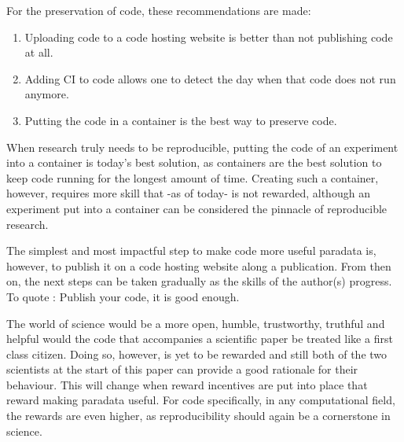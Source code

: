 For the preservation of code, these recommendations are made:

\begin{enumerate}
  \item Uploading code to a code hosting website is better than
    not publishing code at all.
  \item Adding CI to code allows one to detect the day when that code 
    does not run anymore.
  \item Putting the code in a container is the best way to preserve code.
\end{enumerate}


When research truly needs to be reproducible, putting the code 
of an experiment into a container is today's best solution,
as containers are the best solution to keep code running for the longest 
amount of time.
Creating such a container, however, requires more skill
that -as of today- is not rewarded,
although an experiment put into a container 
can be considered the pinnacle of reproducible research.


The simplest and most impactful step to make code more useful paradata
is, however, to publish it on a code hosting website 
along a publication. From then on, the next steps can be taken 
gradually as the skills of the author(s) progress.
To quote \cite{barnes2010publish}: Publish your code, it is good enough.


The world of science would be a more open, humble, trustworthy, truthful
and helpful would the code that accompanies a scientific paper
be treated like a first class citizen. 
Doing so, however, is yet to be rewarded
and still both of the two scientists at the start of this paper 
can provide a good rationale for their behaviour.
This will change when reward incentives are put into place 
that reward making paradata useful.
For code specifically, in any computational field,
the rewards are even higher, as reproducibility should again be 
a cornerstone in science.


